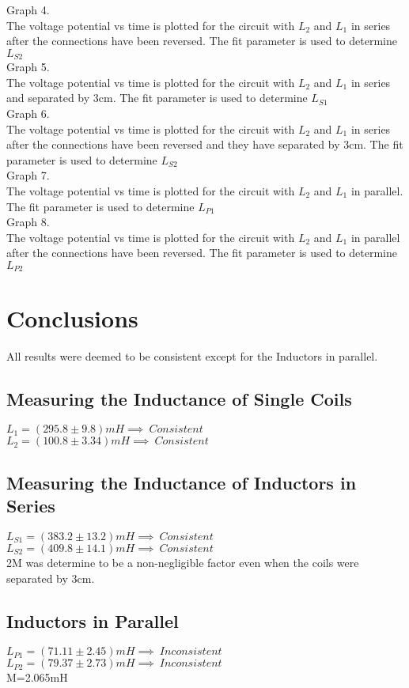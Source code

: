 \documentclass{article}
\begin{document}
Graph 4.\\
The voltage potential vs time is plotted for the circuit with $L_2$ and $L_1$ in series after the connections have been reversed. The fit parameter is used to determine $L_{S2}$\\

Graph 5.\\
The voltage potential vs time is plotted for the circuit with $L_2$ and $L_1$ in series and separated by 3cm. The fit parameter is used to determine $L_{S1}$\\

Graph 6.\\
The voltage potential vs time is plotted for the circuit with $L_2$ and $L_1$ in series after the connections have been reversed and they have separated by 3cm. The fit parameter is used to determine $L_{S2}$\\

Graph 7.\\
The voltage potential vs time is plotted for the circuit with $L_2$ and $L_1$ in parallel. The fit parameter is used to determine $L_{P1}$\\

Graph 8.\\
The voltage potential vs time is plotted for the circuit with $L_2$ and $L_1$ in parallel after the connections have been reversed. The fit parameter is used to determine $L_{P2}$\\
\section{Conclusions}
All results were deemed to be consistent except for the Inductors in parallel.
\subsection{Measuring the Inductance of Single Coils}
$ L_1=(295.8\pm9.8)mH\implies\ Consistent$\\
$L_2=(100.8\pm3.34)mH\implies\ Consistent$

\subsection{Measuring the Inductance of Inductors in Series}
$L_{S1}=(383.2\pm13.2)mH\implies\ Consistent$\\
$L_{S2}=(409.8\pm14.1)mH\implies\ Consistent$\\

2M was determine to be a non-negligible factor even when the coils were separated by 3cm.
\subsection{Inductors in Parallel}

$L_{P1}=(71.11\pm2.45)mH\implies\ Inconsistent$\\
$L_{P2}=(79.37\pm2.73)mH\implies\ Inconsistent$\\
M=2.065mH\\
\end{document}
